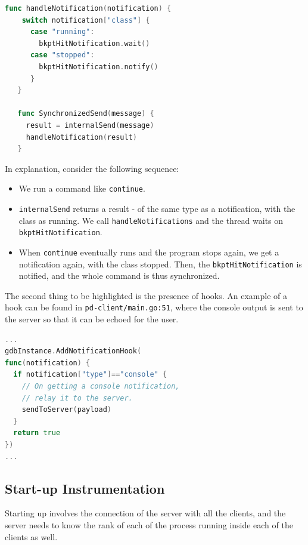 \documentclass[10pt,conference]{IEEEtran}
\begin{document}
\clearpage
\begin{samepage}
\begin{lstlisting}[language=Go, caption=Partial pseudocode for Synchronized Send]
  func handleNotification(notification) {
    switch notification["class"] {
      case "running":
        bkptHitNotification.wait()
      case "stopped":
        bkptHitNotification.notify()
      }
   }

   func SynchronizedSend(message) {
     result = internalSend(message)
     handleNotification(result)
   }
\end{lstlisting}
\end{samepage}
In explanation, consider the following sequence:

\begin{itemize}
  \item We run a command like \texttt{continue}.
  \item \texttt{internalSend} returns a result - of the same type as a notification, with
    the class as running. We call \texttt{handleNotifications} and the thread waits on \texttt{bkptHitNotification}.
  \item When \texttt{continue} eventually runs and the program stops again, we get a notification again, with the class stopped. Then, the \texttt{bkptHitNotification} is notified, and the whole command is thus synchronized.
\end{itemize}

The second thing to be highlighted is the presence of hooks. An example of a hook can be found in \texttt{pd-client/main.go:51}, where the console output is sent to the server so that it can be echoed for the user.

\begin{samepage}
  \begin{lstlisting}[language=Go, caption=Custom hooks for notifications]
...
gdbInstance.AddNotificationHook(
func(notification) {
  if notification["type"]=="console" {
    // On getting a console notification,
    // relay it to the server.
    sendToServer(payload)
  }
  return true
})
...
\end{lstlisting}
\end{samepage}

\subsection{Start-up Instrumentation}

Starting up involves the connection of the server with all the clients, and the server needs to know the rank of each of the process running inside each of the clients as well.
\end{document}
